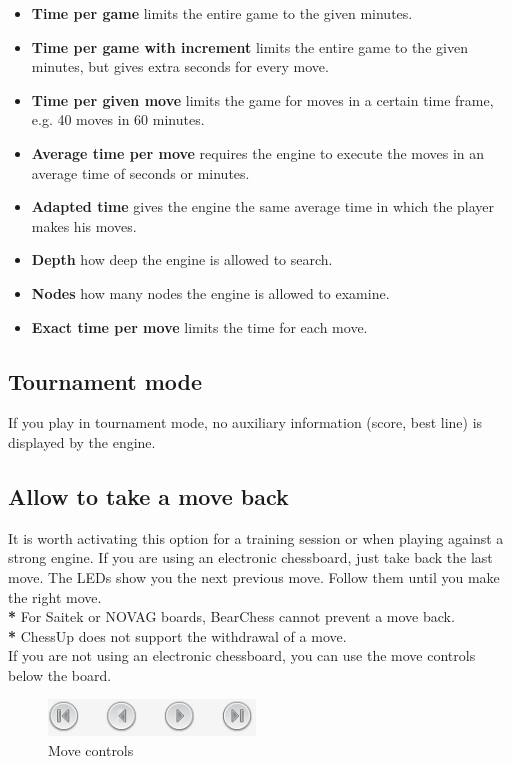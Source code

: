 \documentclass[11pt,a4paper]{article}
\begin{document}
\begin{itemize}
	\item \textbf{Time per game} limits the entire game to the given minutes.
	\item \textbf{Time per game with increment} limits the entire game to the given minutes, but gives extra seconds for every move.
	\item \textbf{Time per given move} limits the game for moves in a certain time frame, e.g. 40 moves in 60 minutes.
	\item \textbf{Average time per move} requires the engine to execute the moves in an average time of seconds or minutes.
	\item \textbf{Adapted time} gives the engine the same average time in which the player makes his moves.	
	\item \textbf{Depth} how deep the engine is allowed to search.	
	\item \textbf{Nodes} how many nodes the engine is allowed to examine.
    \item \textbf{Exact time per move} limits the time for each move.
\end{itemize}


\subsection{Tournament mode}
If you play in tournament mode, no auxiliary information (score, best line) is displayed by the engine.

\subsection{Allow to take a move back}
It is worth activating this option for a training session or when playing against a strong engine. If you are using an electronic chessboard, just take back the last move. The LEDs show you the next previous move. Follow them until you make the right move.\\
{\color{red}\textbf{*}} For Saitek or NOVAG boards, BearChess cannot prevent a move back.\\
{\color{red}\textbf{*}} ChessUp does not support the withdrawal of a move.\\
If you are not using an electronic chessboard, you can use the move controls below the board.

\begin{figure}[H]
	\centering
	\includegraphics[scale=1.0]{MoveControl.png}
	\caption{Move controls}
	\label{fig:MoveControl}
\end{figure}
\end{document}

